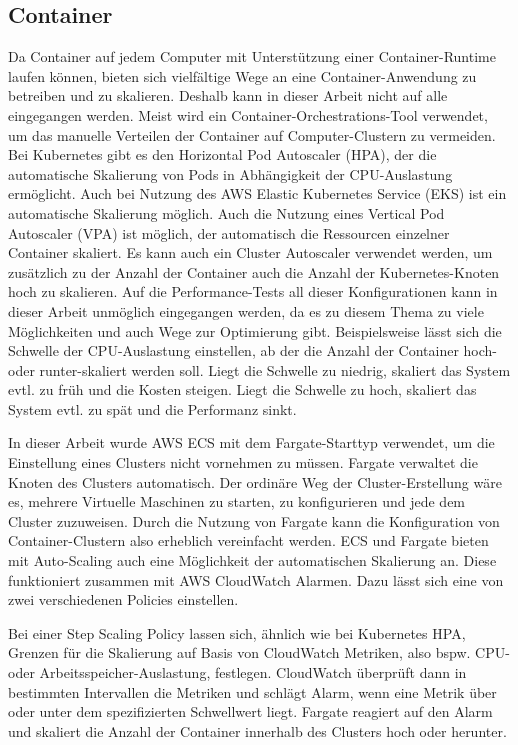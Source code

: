 \subsection{Container}
Da Container auf jedem Computer mit Unterstützung einer Container-Runtime laufen können, bieten sich vielfältige Wege an eine Container-Anwendung zu betreiben und zu skalieren. Deshalb kann in dieser Arbeit nicht auf alle eingegangen werden. Meist wird ein Container-Orchestrations-Tool verwendet, um das manuelle Verteilen der Container auf Computer-Clustern zu vermeiden. Bei Kubernetes gibt es den Horizontal Pod Autoscaler (HPA), der die automatische Skalierung von Pods in Abhängigkeit der CPU-Auslastung ermöglicht\cite{noauthor_horizontal_nodate-1}. Auch bei Nutzung des AWS Elastic Kubernetes Service (EKS) ist ein automatische Skalierung möglich\cite{noauthor_horizontal_nodate}. Auch die Nutzung eines Vertical Pod Autoscaler (VPA) ist möglich, der automatisch die Ressourcen einzelner Container skaliert\cite{noauthor_vertical_nodate}. Es kann auch ein Cluster Autoscaler verwendet werden, um zusätzlich zu der Anzahl der Container auch die Anzahl der Kubernetes-Knoten hoch zu skalieren\cite{noauthor_cluster_nodate}.
Auf die Performance-Tests all dieser Konfigurationen kann in dieser Arbeit unmöglich eingegangen werden, da es zu diesem Thema zu viele Möglichkeiten und auch Wege zur Optimierung gibt. Beispielsweise lässt sich die Schwelle der CPU-Auslastung einstellen, ab der die Anzahl der Container hoch- oder runter-skaliert werden soll. Liegt die Schwelle zu niedrig, skaliert das System evtl. zu früh und die Kosten steigen. Liegt die Schwelle zu hoch, skaliert das System evtl. zu spät und die Performanz sinkt.

In dieser Arbeit wurde AWS ECS mit dem Fargate-Starttyp verwendet, um die Einstellung eines Clusters nicht vornehmen zu müssen. Fargate verwaltet die Knoten des Clusters automatisch. Der ordinäre Weg der Cluster-Erstellung wäre es, mehrere Virtuelle Maschinen zu starten, zu konfigurieren und jede dem Cluster zuzuweisen. Durch die Nutzung von Fargate kann die Konfiguration von Container-Clustern also erheblich vereinfacht werden. ECS und Fargate bieten mit Auto-Scaling auch eine Möglichkeit der automatischen Skalierung an. Diese funktioniert zusammen mit AWS CloudWatch Alarmen. Dazu lässt sich eine von zwei verschiedenen Policies einstellen.

Bei einer Step Scaling Policy lassen sich, ähnlich wie bei Kubernetes HPA, Grenzen für die Skalierung auf Basis von CloudWatch Metriken, also bspw. CPU- oder Arbeitsspeicher-Auslastung, festlegen. CloudWatch überprüft dann in bestimmten Intervallen die Metriken und schlägt Alarm, wenn eine Metrik über oder unter dem spezifizierten Schwellwert liegt. Fargate reagiert auf den Alarm und skaliert die Anzahl der Container innerhalb des Clusters hoch oder herunter. 

